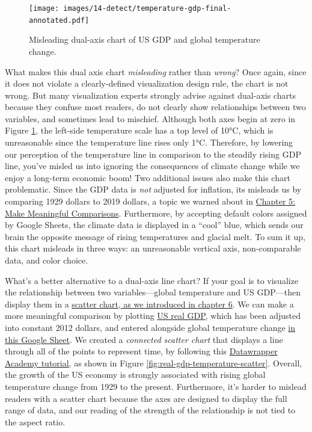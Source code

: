 \documentclass[
  english,
]{book}
\begin{document}
\begin{figure}
\centering
\texttt{[image: images/14-detect/temperature-gdp-final-annotated.pdf]}
\caption{\label{fig:temperature-gdp-final-annotated}Misleading dual-axis chart of US GDP and global temperature change.}
\end{figure}

What makes this dual axis chart \emph{misleading} rather than \emph{wrong}? Once again, since it does not violate a clearly-defined visualization design rule, the chart is not wrong. But many visualization experts strongly advise against dual-axis charts because they confuse most readers, do not clearly show relationships between two variables, and sometimes lead to mischief. Although both axes begin at zero in Figure \ref{fig:temperature-gdp-final-annotated}, the left-side temperature scale has a top level of 10°C, which is unreasonable since the temperature line rises only 1°C. Therefore, by lowering our perception of the temperature line in comparison to the steadily rising GDP line, you've misled us into ignoring the consequences of climate change while we enjoy a long-term economic boom! Two additional issues also make this chart problematic. Since the GDP data is \emph{not} adjusted for inflation, its misleads us by comparing 1929 dollars to 2019 dollars, a topic we warned about in \href{comparisons.html}{Chapter 5: Make Meaningful Comparisons}. Furthermore, by accepting default colors assigned by Google Sheets, the climate data is displayed in a ``cool'' blue, which sends our brain the opposite message of rising temperatures and glacial melt. To sum it up, this chart misleads in three ways: an unreasonable vertical axis, non-comparable data, and color choice.

What's a better alternative to a dual-axis line chart? If your goal is to visualize the relationship between two variables---global temperature and US GDP---then display them in a \href{scatter-bubble-datawrapper.html}{scatter chart, as we introduced in chapter 6}. We can make a more meaningful comparison by plotting \href{https://fred.stlouisfed.org/series/GDPCA}{US real GDP}, which has been adjusted into constant 2012 dollars, and entered alongside global temperature change \href{https://docs.google.com/spreadsheets/d/1Npc7ozRjlsgRLLEV_B5zBvqyRqL6akE2qrEIGegHfGU/edit\#gid=374640985}{in this Google Sheet}. We created a \emph{connected scatter chart} that displays a line through all of the points to represent time, by following this \href{https://academy.datawrapper.de/article/260-how-to-connect-scatterplot-dots-with-lines}{Datawrapper Academy tutorial}, as shown in Figure \ref{fig:real-gdp-temperature-scatter}. Overall, the growth of the US economy is strongly associated with rising global temperature change from 1929 to the present. Furthermore, it's harder to mislead readers with a scatter chart because the axes are designed to display the full range of data, and our reading of the strength of the relationship is not tied to the aspect ratio.
\end{document}
